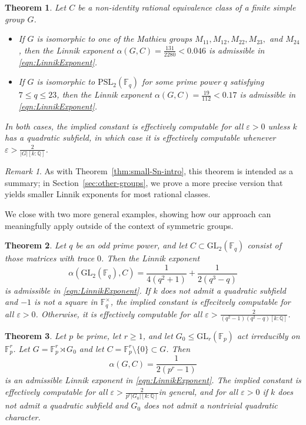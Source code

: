 \documentclass[12pt]{amsart}
\newtheorem{theorem}{Theorem}
\theoremstyle{definition} \newtheorem{definition}[theorem]{Definition}
\theoremstyle{example} \newtheorem{example}[theorem]{Example}
\theoremstyle{remark} \newtheorem{remark}{Remark}[theorem]
\numberwithin{equation}{section}
\numberwithin{theorem}{section}
\renewcommand{\epsilon}{\varepsilon}
\renewcommand{\leq}{\leqslant}
\renewcommand{\geq}{\geqslant}
\begin{document}
	\begin{theorem} \label{thm:simple-examples}
	Let $C$ be a non-identity rational equivalence class of a finite simple group $G$.
	\begin{itemize}
		\item If $G$ is isomorphic to one of the Mathieu groups $M_{11}, M_{12}, M_{22}, M_{23},$ and $M_{24}$, then the Linnik exponent $\alpha(G,C) =\frac{131}{2280} < 0.046$ is admissible in \eqref{eqn:LinnikExponent}. 
		\item If $G$ is isomorphic to $\mathrm{PSL}_2(\mathbb{F}_q)$ for some prime power $q$ satisfying $7 \leq q \leq 23$, then the Linnik exponent $\alpha(G,C) = \frac{19}{112} < 0.17$ is admissible in \eqref{eqn:LinnikExponent}.
	\end{itemize}
	In both cases, the implied constant is effectively computable for all $\epsilon > 0$ unless $k$ has a quadratic subfield, in which case it is effectively computable whenever $\epsilon > \frac{2}{|G|[k:\mathbb{Q}]}$.
	\end{theorem}

	\begin{remark}
		As with Theorem~\ref{thm:small-Sn-intro}, this theorem is intended as a summary; in Section~\ref{sec:other-groups}, we prove a more precise version that yields smaller Linnik exponents for most rational classes.
	\end{remark}
	
	We close with two more general examples, showing how our approach can meaningfully apply outside of the context of symmetric groups.
	\begin{theorem}
		\label{thm:trace-zero}
		Let $q$ be an odd prime power, and let $C \subset \mathrm{GL}_2(\mathbb{F}_q)$ consist of those matrices with trace $0$.  Then the Linnik exponent
			\[
				\alpha(\mathrm{GL}_2(\mathbb{F}_q),C)	
					= \frac{1}{4(q^2+1)} + \frac{1}{2(q^3-q)}
			\]
		is admissible in \eqref{eqn:LinnikExponent}.  If $k$ does not admit a quadratic subfield and $-1$ is not a square in $\mathbb{F}_q^\times$, the implied constant is effecitvely computable for all $\epsilon>0$.  Otherwise, it is effectively computable for all $\epsilon >  \frac{2}{(q^2-1)(q^2-q) [ k:\mathbb{Q}]}$.
	\end{theorem}
	
	\begin{theorem}
		\label{thm:semidirect-product}
		Let $p$ be prime, let $r \geq 1$, and let $G_0 \leq \mathrm{GL}_r(\mathbb{F}_p)$ act irreducibly on $\mathbb{F}_p^r$.  Let $G = \mathbb{F}_p^r \rtimes G_0$ and let $C = \mathbb{F}_p^r \setminus \{0\} \subset G$.  Then
			\[
				\alpha(G,C)
					= \frac{1}{2(p^r-1)}
			\]
		is an admissible Linnik exponent in \eqref{eqn:LinnikExponent}.  The implied constant is effectively computable for all $\epsilon > \frac{2}{p^r|G_0|[k:\mathbb{Q}]}$in general, and for all $\epsilon > 0$ if $k$ does not admit a quadratic subfield and $G_0$ does not admit a nontrivial quadratic character.
	\end{theorem}
\end{document}
